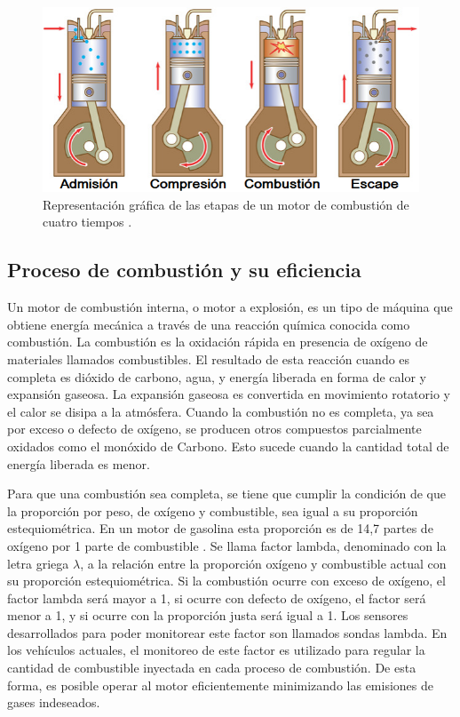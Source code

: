 \begin{figure}[htpb]
\centering
\includegraphics[width=.9\textwidth]{./Figures/motor-combustion.png}
\caption{Representación gráfica de las etapas de un motor de combustión de cuatro tiempos \protect\footnotemark[2].}
\label{fig:motor-combustion}
\end{figure}

\subsection{Proceso de combustión y su eficiencia}

Un motor de combustión interna, o motor a explosión, es un tipo de máquina que obtiene energía mecánica a través de una reacción química conocida como combustión. La combustión es la oxidación rápida en presencia de oxígeno de materiales llamados combustibles. El resultado de esta reacción cuando es completa es dióxido de carbono, agua, y energía liberada en forma de calor y expansión gaseosa. La expansión gaseosa es convertida en movimiento rotatorio y el calor se disipa a la atmósfera. Cuando la combustión no es completa, ya sea por exceso o defecto de oxígeno, se producen otros compuestos parcialmente oxidados como el monóxido de Carbono. Esto sucede cuando la cantidad total de energía liberada es menor.

Para que una combustión sea completa, se tiene que cumplir la condición de que la proporción por peso, de oxígeno y combustible, sea igual a su proporción estequiométrica. En un motor de gasolina esta proporción es de 14,7 partes de oxígeno por 1 parte de combustible \citep{book-afr}. Se llama factor lambda, denominado con la letra griega $\lambda$, a la relación entre la proporción oxígeno y combustible actual con su proporción estequiométrica. Si la combustión ocurre con exceso de oxígeno, el factor lambda será mayor a 1, si ocurre con defecto de oxígeno, el factor será menor a 1, y si ocurre con la proporción justa será igual a 1. Los sensores desarrollados para poder monitorear este factor son llamados sondas lambda. En los vehículos actuales, el monitoreo de este factor es utilizado para regular la cantidad de combustible inyectada en cada proceso de combustión. De esta forma, es posible operar al motor eficientemente minimizando las emisiones de gases indeseados.

